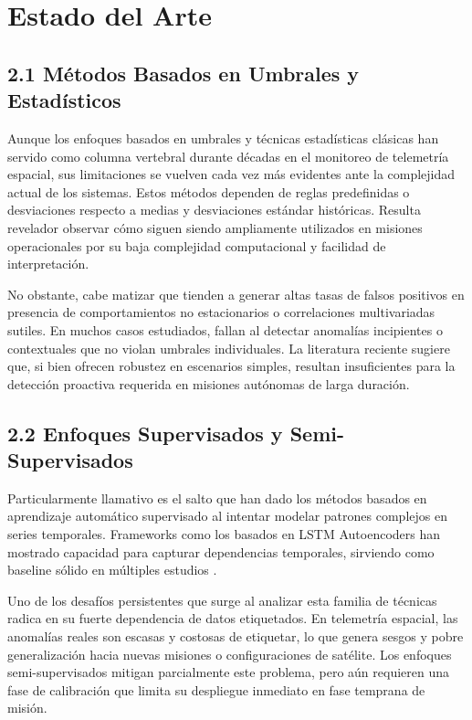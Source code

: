\section{Estado del Arte}

\subsection{2.1 Métodos Basados en Umbrales y Estadísticos}

Aunque los enfoques basados en umbrales y técnicas estadísticas clásicas han servido como columna vertebral durante décadas en el monitoreo de telemetría espacial, sus limitaciones se vuelven cada vez más evidentes ante la complejidad actual de los sistemas. Estos métodos dependen de reglas predefinidas o desviaciones respecto a medias y desviaciones estándar históricas. Resulta revelador observar cómo siguen siendo ampliamente utilizados en misiones operacionales por su baja complejidad computacional y facilidad de interpretación.

No obstante, cabe matizar que tienden a generar altas tasas de falsos positivos en presencia de comportamientos no estacionarios o correlaciones multivariadas sutiles. En muchos casos estudiados, fallan al detectar anomalías incipientes o contextuales que no violan umbrales individuales. La literatura reciente sugiere que, si bien ofrecen robustez en escenarios simples, resultan insuficientes para la detección proactiva requerida en misiones autónomas de larga duración.

\subsection{2.2 Enfoques Supervisados y Semi-Supervisados}

Particularmente llamativo es el salto que han dado los métodos basados en aprendizaje automático supervisado al intentar modelar patrones complejos en series temporales. Frameworks como los basados en LSTM Autoencoders han mostrado capacidad para capturar dependencias temporales, sirviendo como baseline sólido en múltiples estudios \cite{Xu2022_LSTM}. 

Uno de los desafíos persistentes que surge al analizar esta familia de técnicas radica en su fuerte dependencia de datos etiquetados. En telemetría espacial, las anomalías reales son escasas y costosas de etiquetar, lo que genera sesgos y pobre generalización hacia nuevas misiones o configuraciones de satélite. Los enfoques semi-supervisados mitigan parcialmente este problema, pero aún requieren una fase de calibración que limita su despliegue inmediato en fase temprana de misión.

